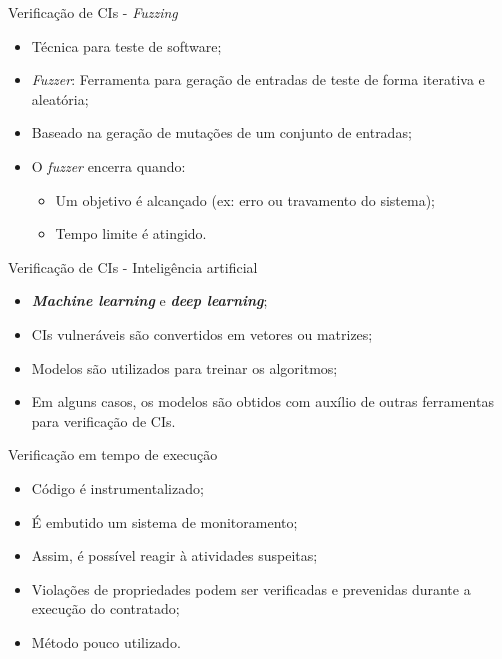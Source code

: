 \begin{frame}{Verificação de CIs - \textit{Fuzzing}}
    \begin{itemize}
        \item Técnica para teste de software;
        \item \textit{Fuzzer}: Ferramenta para geração de entradas de teste de forma iterativa e aleatória;
        \item Baseado na geração de mutações de um conjunto de entradas;
        \item O \textit{fuzzer} encerra quando:
        \begin{itemize}
            \item Um objetivo é alcançado (ex: erro ou travamento do sistema);
            \item Tempo limite é atingido.
        \end{itemize}
    \end{itemize}
\end{frame}

\begin{frame}{Verificação de CIs - Inteligência artificial}
    \begin{itemize}
        \item \textbf{\textit{Machine learning}} e \textbf{\textit{deep learning}};
        \item CIs vulneráveis são convertidos em vetores ou matrizes;
        \item Modelos são utilizados para treinar os algoritmos;
        \item Em alguns casos, os modelos são obtidos com auxílio de outras ferramentas para verificação de CIs.
    \end{itemize}
\end{frame}

\begin{frame}{Verificação em tempo de execução}
    \begin{itemize}
        \item Código é instrumentalizado;
        \item É embutido um sistema de monitoramento;
        \item Assim, é possível reagir à atividades suspeitas;
        \item Violações de propriedades podem ser verificadas e prevenidas durante a execução do contratado;
        \item Método pouco utilizado.
    \end{itemize}
\end{frame}